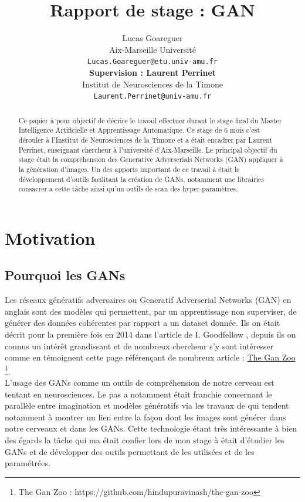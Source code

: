 \documentclass[11pt,francais]{article}
\title{Rapport de stage : GAN}
\author{Lucas Goareguer \\
  Aix-Marseille Université \\
  {\small \texttt{Lucas.Goareguer@etu.univ-amu.fr}   } \\\And
   {\bf Supervision : Laurent Perrinet} \\
  Institut de Neurosciences de la Timone \\
  {\small \tt Laurent.Perrinet@univ-amu.fr} \\}
\date{}
\begin{document}
\maketitle
\begin{abstract}
Ce papier à pour objectif de décrire le travail effectuer durant le stage final du Master Intelligence Artificielle et Apprentissage Automatique.
Ce stage de 6 mois c'est dérouler à l'Institut de Neurosciences de la Timone et a était encadrer par Laurent Perrinet, enseignant chercheur à l'université d'Aix-Marseille.
Le principal objectif du stage était la compréhension des Generative Adverserials Networks (GAN) appliquer à la génération d'images. Un des apports important de ce travail à était le développement d'outils facilitant la création de GANs, notamment une librairies consacrer a cette tâche ainsi qu'un outils de scan des hyper-paramètres.
\end{abstract}


\section{Motivation}

\subsection{Pourquoi les GANs}
\label{sec:Intro}
Les réseaux génératifs adversaires ou Generatif Adverserial Networks (GAN) en anglais sont des modèles qui permettent, par un apprentissage non superviser, de générer des données cohérentes par rapport a un dataset donnée. Ils on était décrit pour la première fois en 2014 dans l'article de I. Goodfellow \cite{NIPS2014_5423}, depuis ils on connus un intérêt grandissant et de nombreux chercheur s'y sont intéresser comme en témoignent cette page référençant de nombreux article : \href{https://github.com/hindupuravinash/the-gan-zoo}{The Gan Zoo} \footnote{\label{note1}The Gan Zoo : https://github.com/hindupuravinash/the-gan-zoo}.\\
L'usage des GANs comme un outils de compréhension de notre cerveau est tentant en neurosciences. Le pas a notamment était franchie concernant le parallèle entre imagination et modèles génératifs via les travaux de \cite{GAN_Brain_Signals} qui tendent notamment à montrer un lien entre la façon dont les images sont générer dans notre cerveaux et dans les GANs. 
Cette technologie étant très intéressante à bien des égards la tâche qui ma était confier lors de mon stage à était d'étudier les GANs et de développer des outils permettant de les utilisées et de les paramétrées. 
\end{document}
